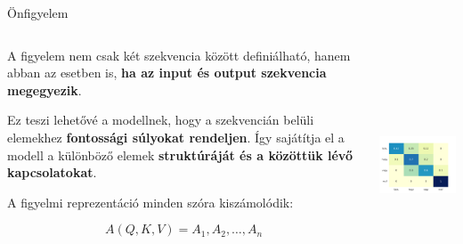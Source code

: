 \documentclass[english, aspectratio=169]{beamer}
\begin{document}
\begin{frame}{Önfigyelem}
\begin{columns}
\begin{column}{.5\textwidth}
A figyelem nem csak két szekvencia között definiálható, hanem abban az esetben is, \textbf{ha az input és output szekvencia megegyezik}.\par\smallskip
Ez teszi lehetővé a modellnek, hogy a szekvencián belüli elemekhez \textbf{fontossági súlyokat rendeljen}. Így sajátítja el a modell a különböző elemek \textbf{struktúráját és a közöttük lévő kapcsolatokat}.\par\smallskip
A figyelmi reprezentáció minden szóra kiszámolódik:
\begin{block}{}
\vspace{-0.2cm}
\[
A(Q,K,V) = A_1,A_2,\ldots,A_n
\]
\end{block}
\end{column}
\begin{column}{.5\textwidth}
\begin{center}
\includegraphics[width=7cm, height=7cm, keepaspectratio]{images/self_attention.png}
\end{center}
\end{column}
\end{columns}
\end{frame}
\end{document}
